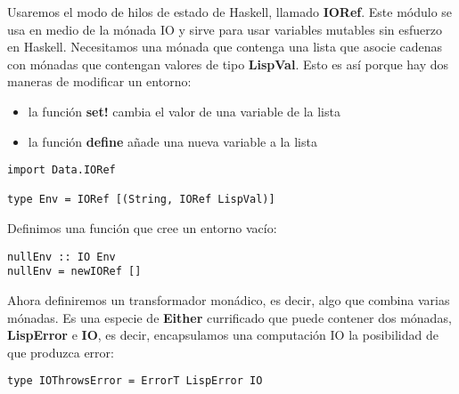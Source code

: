 Usaremos el modo de hilos de estado de Haskell, llamado \textbf{IORef}. Este m\'odulo se usa en medio de la m\'onada IO y sirve para usar variables mutables sin esfuerzo en Haskell. Necesitamos una m\'onada que contenga una lista que asocie cadenas con m\'onadas que contengan valores de tipo \textbf{LispVal}. Esto es as\'i porque hay dos maneras de modificar un entorno:\\

\begin{itemize}
  \item la funci\'on \textbf{set!} cambia el valor de una variable de la lista
  \item la funci\'on \textbf{define} a\~{n}ade una nueva variable a la lista
\end{itemize}

\begin{minipage}{\linewidth}
\begin{footnotesize}
\begin{lstlisting}[frame=single]
import Data.IORef

type Env = IORef [(String, IORef LispVal)]
\end{lstlisting}
\end{footnotesize}
\end{minipage}

Definimos una funci\'on que cree un entorno vac\'io:\\

\begin{minipage}{\linewidth}
\begin{footnotesize}
\begin{lstlisting}[frame=single]
nullEnv :: IO Env
nullEnv = newIORef []
\end{lstlisting}
\end{footnotesize}
\end{minipage}

Ahora definiremos un transformador mon\'adico, es decir, algo que combina varias m\'onadas. Es una especie de \textbf{Either} currificado que puede contener dos m\'onadas, \textbf{LispError} e \textbf{IO}, es decir, encapsulamos una computaci\'on IO la posibilidad de que produzca error:\\

\begin{minipage}{\linewidth}
\begin{footnotesize}
\begin{lstlisting}[frame=single]
type IOThrowsError = ErrorT LispError IO
\end{lstlisting}
\end{footnotesize}
\end{minipage}

